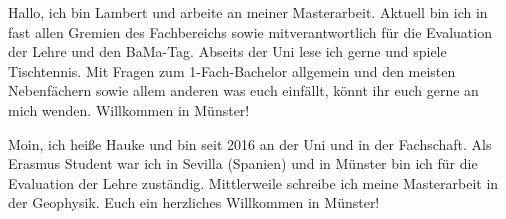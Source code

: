 \begin{multicols}{2}
\small


{
Hallo, ich bin Lambert und arbeite an meiner Masterarbeit. Aktuell bin ich in fast allen Gremien des Fachbereichs sowie mitverantwortlich für die Evaluation der Lehre und den BaMa-Tag. Abseits der Uni lese ich gerne und spiele Tischtennis. Mit Fragen zum 1-Fach-Bachelor allgemein und den meisten Nebenfächern sowie allem anderen was euch einfällt, könnt ihr euch gerne an mich wenden. Willkommen in Münster!
}

\vspace{-0.5cm}

{
Moin, ich heiße Hauke und bin seit 2016 an der Uni und in der Fachschaft. Als Erasmus Student war ich in Sevilla (Spanien) und in Münster bin ich für die Evaluation der Lehre zuständig. Mittlerweile schreibe ich meine Masterarbeit in der Geophysik. 
Euch ein herzliches Willkommen in Münster!
}


\end{multicols}
